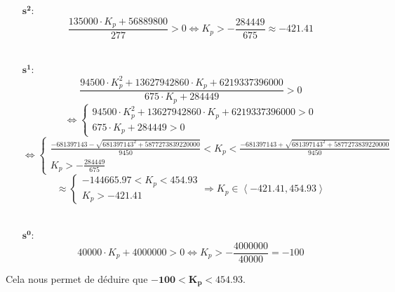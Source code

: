 \documentclass[a4paper,12pt]{article}
\begin{document}
    \begin{itemize}
        \item[$\mathbf{s^2 :}$] \begin{equation}
                \frac{135000 \cdot K_p + 56889800}{277} > 0
                \Leftrightarrow \boxed{
                    K_p > -\frac{284449}{675} \approx -421.41
                }
            \end{equation} \\
        \item[$\mathbf{s^1 :}$] \[
                \frac{94500 \cdot K_p^2 + 13627942860 \cdot K_p + 6219337396000}{675 \cdot K_p + 284449} > 0
            \]\[
                \Leftrightarrow
                \begin{cases}
                    94500 \cdot K_p^2 + 13627942860 \cdot K_p + 6219337396000 > 0 \\
                    675 \cdot K_p + 284449 > 0
                \end{cases}
            \]\[
                \Leftrightarrow
                \begin{cases}
                    \frac{-681397143 - \sqrt{681397143^2 + 5877273839220000}}{9450} < K_p < \frac{-681397143 + \sqrt{681397143^2 + 5877273839220000}}{9450} \\
                    K_p > -\frac{284449}{675}
                \end{cases}
            \] \begin{equation}
                \approx
                \begin{cases}
                    -144665.97 < K_p < 454.93 \\
                    K_p > -421.41
                \end{cases}
                \Rightarrow \boxed{
                    K_p \in \left< -421.41, 454.93 \right>
                }
            \end{equation} \\
        \item[$\mathbf{s^0 :}$] \begin{equation}
                40000 \cdot K_p + 4000000 > 0
                \Leftrightarrow \boxed{
                    K_p > -\frac{4000000}{40000} = -100
                }
            \end{equation}
    \end{itemize}
    
    Cela nous permet de déduire que $\mathbf{-100 < K_p < 454.93}$.
    
\end{document}
